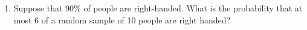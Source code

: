 \begin{enumerate}[label=\thechapter.\arabic*,ref=\thechapter.\theenumi]
\item Suppose that 90\% of people are right-handed. What is the probability that at most 6 of a random sample of 10 people are right handed?
\end{enumerate}
